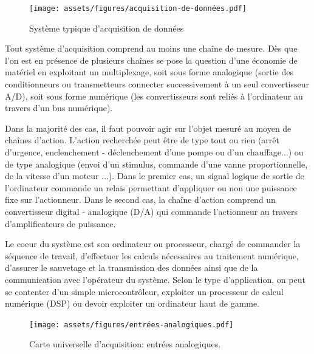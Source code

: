\begin{figure}[h]
\centering
\texttt{[image: assets/figures/acquisition-de-données.pdf]}
\caption{Système typique d'acquisition de données}
\label{fig:SystemeTypiquedAcquisitionDeDonnees}
\end{figure}

Tout système d'acquisition comprend au moins une chaîne de mesure. Dès que l'on est en présence de plusieurs chaînes se pose la question d'une économie de matériel en exploitant un multiplexage, soit sous forme analogique (sortie des conditionneurs ou transmetteurs connecter successivement à un seul convertisseur A/D), soit sous forme numérique (les convertisseurs sont reliés à l'ordinateur au travers d'un bus numérique).

Dans la majorité des cas, il faut pouvoir agir sur l'objet mesuré au moyen de chaînes d'action. L'action recherchée peut être de type tout ou rien (arrêt d'urgence, enclenchement - déclenchement d'une pompe ou d'un chauffage...) ou de type analogique (envoi d'un stimulus, commande d'une vanne proportionnelle, de la vitesse d'un moteur ...). Dans le premier cas, un signal logique de sortie de l'ordinateur commande un relais permettant d'appliquer ou non une puissance fixe sur l'actionneur. Dans le second cas, la chaîne d'action comprend un convertisseur digital - analogique (D/A) qui commande l'actionneur au travers d'amplificateurs de puissance.

Le coeur du système est son ordinateur ou processeur, chargé de commander la séquence de travail, d'effectuer les calculs nécessaires au traitement numérique, d'assurer le sauvetage et la transmission des données ainsi que de la communication avec l'opérateur du système. Selon le type d'application, on peut se contenter d'un simple microcontrôleur, exploiter un processeur de calcul numérique (DSP) ou devoir exploiter un ordinateur haut de gamme.

\begin{figure}[ht]
    \centering
	\texttt{[image: assets/figures/entrées-analogiques.pdf]}
	\caption{Carte universelle d'acquisition: entrées analogiques.}
	\label{fig:Analog_Frontend}
\end{figure}

